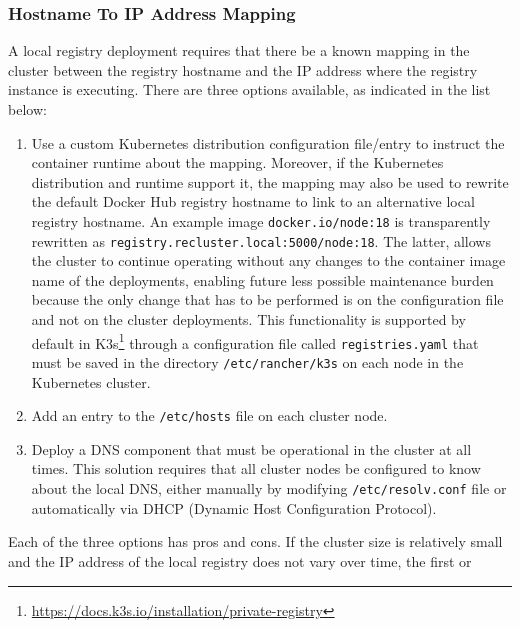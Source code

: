 \subsubsection{Hostname To IP Address Mapping}
\label{subsubsec:implementation_dependencies_docker_registry_hostname_to_ip_address_mapping}

A local registry deployment requires that there be a known mapping in the cluster
between the registry hostname and the IP address where the registry instance is executing.
There are three options available, as indicated in the list below:
\begin{enumerate}
  \item Use a custom Kubernetes distribution configuration file/entry to instruct
    the container runtime about the mapping. Moreover, if the Kubernetes distribution
    and runtime support it, the mapping may also be used to rewrite the default
    Docker Hub registry hostname to link to an alternative local registry
    hostname. An example image \texttt{docker.io/node:18} is transparently
    rewritten as \texttt{registry.recluster.local:5000/node:18}. The latter, allows
    the cluster to continue operating without any changes to the container image
    name of the deployments, enabling future less possible maintenance burden
    because the only change that has to be performed is on the configuration
    file and not on the cluster deployments.
    \newline
    This functionality is supported by default in K3s\footnote{\url{https://docs.k3s.io/installation/private-registry}}
    through a configuration file called \texttt{registries.yaml} that must be
    saved in the directory \texttt{/etc/rancher/k3s} on each node in the
    Kubernetes cluster.

  \item Add an entry to the \texttt{/etc/hosts} file on each cluster node.

  \item Deploy a DNS component that must be operational in the cluster at all times.
    \newline
    This solution requires that all cluster nodes be configured to know about
    the local DNS, either manually by modifying \texttt{/etc/resolv.conf} file or
    automatically via DHCP (Dynamic Host Configuration Protocol).
\end{enumerate}
Each of the three options has pros and cons. If the cluster size is relatively small
and the IP address of the local registry does not vary over time, the first or
